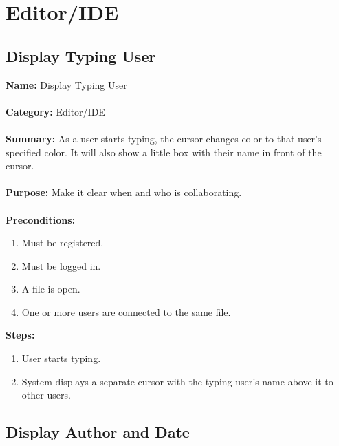 \documentclass[14pt, a4paper]{article}
\begin{document}
\newpage	
		
\section{Editor/IDE}

\subsection{Display Typing User}

\begin{framed}
	\noindent\textbf{Name:} Display Typing User \\ \\
	\textbf{Category:} Editor/IDE \\ \\
	\textbf{Summary:} As a user starts typing, the cursor changes color to that user’s specified color. It will also show a little box with their name in front of the cursor. \\ \\
	\textbf{Purpose:} Make it clear when and who is collaborating. \\ \\
	\textbf{Preconditions:} 
	\begin{enumerate}
		\item Must be registered.
		\item Must be logged in.
		\item A file is open.
		\item One or more users are connected to the same file.
	\end{enumerate}
	\textbf{Steps:}
	\begin{enumerate}
		\item User starts typing.
		\item System displays a separate cursor with the typing user’s name above it to other users.
	\end{enumerate}
\end{framed}

\newpage

\subsection{Display Author and Date}
\end{document}

